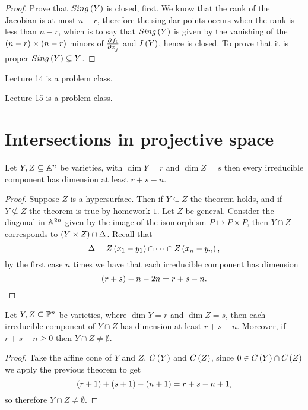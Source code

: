 \begin{proof}
Prove that $ Sing\br{Y} $ is closed, first. We know that the rank of the Jacobian is at most $ n - r $, therefore the singular points occurs when the rank is less than $ n - r $, which is to say that $ Sing\br{Y} $ is given by the vanishing of the $ \br{n - r} \times \br{n - r} $ minors of $ \tpd{f_i}{x_j} $ and $ I\br{Y} $, hence is closed. To prove that it is proper $ Sing\br{Y} \subsetneq Y $.
\end{proof}


Lecture 14 is a problem class.


Lecture 15 is a problem class.

\pagebreak

\section{Intersections in projective space}


\begin{theorem}
Let $ Y, Z \subseteq \AA^n $ be varieties, with $ \dim Y = r $ and $ \dim Z = s $ then every irreducible component has dimension at least $ r + s - n $.
\end{theorem}

\begin{proof}
Suppose $ Z $ is a hypersurface. Then if $ Y \subseteq Z $ the theorem holds, and if $ Y \nsubseteq Z $ the theorem is true by homework $ 1 $. Let $ Z $ be general. Consider the diagonal in $ \AA^{2n} $ given by the image of the isomorphism $ P \mapsto P \times P $, then $ Y \cap Z $ corresponds to $ \br{Y \times Z} \cap \Delta $. Recall that
$$ \Delta = Z\br{x_1 - y_1} \cap \dots \cap Z\br{x_n - y_n}, $$
by the first case $ n $ times we have that each irreducible component has dimension
$$ \br{r + s} - n - 2n = r + s - n. $$
\end{proof}

\begin{theorem}
Let $ Y, Z \subseteq \PP^n $ be varieties, where $ \dim Y = r $ and $ \dim Z = s $, then each irreducible component of $ Y \cap Z $ has dimension at least $ r + s - n $. Moreover, if $ r + s - n \ge 0 $ then $ Y \cap Z \ne \emptyset $.
\end{theorem}

\begin{proof}
Take the affine cone of $ Y $ and $ Z $, $ C\br{Y} $ and $ C\br{Z} $, since $ 0 \in C\br{Y} \cap C\br{Z} $ we apply the previous theorem to get
$$ \br{r + 1} + \br{s + 1} - \br{n + 1} = r + s - n + 1, $$
so therefore $ Y \cap Z \ne \emptyset $.
\end{proof}

